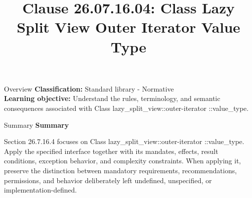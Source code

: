 \documentclass[10pt,letterpaper]{article}
\title{Clause 26.07.16.04: Class Lazy Split View Outer Iterator Value Type}
\author{}
\date{}
\begin{document}
\maketitle
\begin{CornellOverviewBox}{Overview}
\textbf{Classification:} Standard library - Normative\\[2pt]
\textbf{Learning objective:} Understand the rules, terminology, and semantic consequences associated with Class lazy\_split\_view::outer-iterator ::value\_type.
\end{CornellOverviewBox}\begin{CornellSummaryBox}{Summary}
{\sffamily\bfseries\color{Accent} Summary}\par\vspace{3pt}Section 26.7.16.4 focuses on Class lazy\_split\_view::outer-iterator ::value\_type. Apply the specified interface together with its mandates, effects, result conditions, exception behavior, and complexity constraints. When applying it, preserve the distinction between mandatory requirements, recommendations, permissions, and behavior deliberately left undefined, unspecified, or implementation-defined.
\end{CornellSummaryBox}
\end{document}
